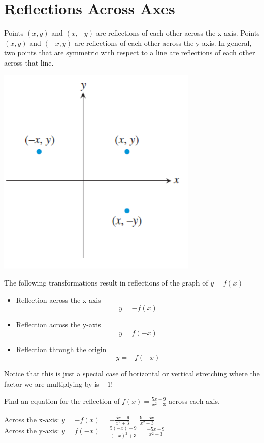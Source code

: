\documentclass[handout, noauthor, nooutcomes]{ximera}
\begin{document}
\section{Reflections Across Axes}
Points $(x,y)$ and $(x,-y)$ are reflections of each other across the x-axis. Points $(x, y)$ and $(-x, y)$ are reflections of each other across the y-axis. In general, two points that are symmetric with respect to a line are reflections of each other across that line.
\begin{image}
\includegraphics[]{images/reflectiongraph}
\end{image}
\begin{callout}
The following transformations result in reflections of the graph of $y = f(x)$
\begin{itemize}
\item Reflection across the x-axis
\[
y=-f(x)
\]
\item Reflection across the y-axis
\[
y=f(-x)
\]
\item Reflection through the origin
\[
y=-f(-x)
\]
\end{itemize}
\end{callout}

Notice that this is just a special case of horizontal or vertical stretching where the factor we are multiplying by is $-1$!

\begin{example}
Find an equation for the reflection of $f(x) = \frac{5x - 9}{x^2+3}$ across each axis.
\\
\begin{explanation}
Across the x-axis: $y = -f(x) = -\frac{5x-9}{x^2+3}=\frac{9-5x}{x^2+3}$
\\
Across the y-axis: $y = f(-x) = \frac{5(-x)-9}{(-x)^2+3}=\frac{-5x-9}{x^2+3}$
\end{explanation}
\end{example}
\end{document}
